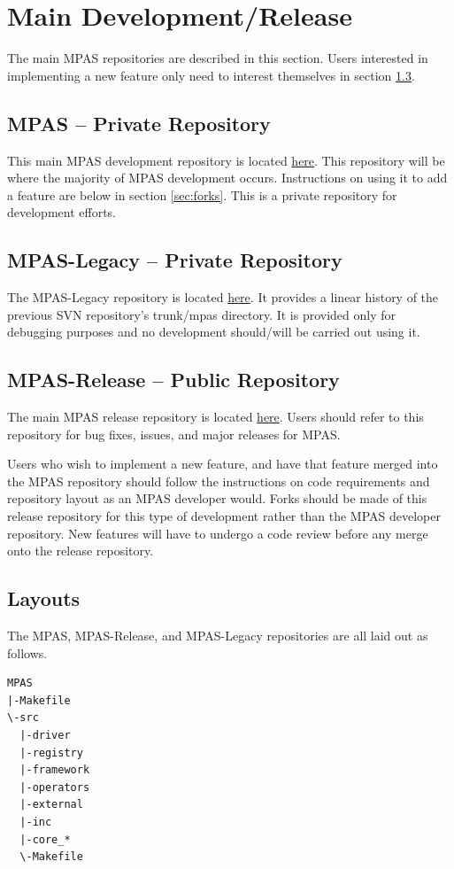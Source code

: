 \documentclass[11pt]{report}
\begin{document}
\section{Main Development/Release}
The main MPAS repositories are described in this section. Users interested in
implementing a new feature only need to interest themselves in section
\ref{subsec:mpas_release}.


\subsection{MPAS -- Private Repository}
This main MPAS development repository is located
\href{https://github.com/MPAS-Dev/MPAS}{here}.  This repository will be where
the majority of MPAS development occurs.  Instructions on using it to add a
feature are below in section \ref{sec:forks}. This is a private repository for
development efforts.

\subsection{MPAS-Legacy -- Private Repository}
The MPAS-Legacy repository is located
\href{https://github.com/MPAS-Dev/MPAS-Legacy}{here}. It provides a linear
history of the previous SVN repository's trunk/mpas directory. It is provided
only for debugging purposes and no development should/will be carried out using
it.

\subsection{MPAS-Release -- Public Repository}
\label{subsec:mpas_release}
The main MPAS release repository is located
\href{https://github.com/MPAS-Dev/MPAS-Release}{here}.  Users should refer to
this repository for bug fixes, issues, and major releases for MPAS.

Users who wish to implement a new feature, and have that feature merged into
the MPAS repository should follow the instructions on code requirements and
repository layout as an MPAS developer would. Forks should be made of this
release repository for this type of development rather than the MPAS developer
repository. New features will have to undergo a code review before any merge
onto the release repository.

\subsection{Layouts}
The MPAS, MPAS-Release, and MPAS-Legacy repositories are all laid out as follows.
\begin{lstlisting}
MPAS
|-Makefile
\-src
  |-driver
  |-registry
  |-framework
  |-operators
  |-external
  |-inc
  |-core_*
  \-Makefile
\end{lstlisting}
\end{document}
